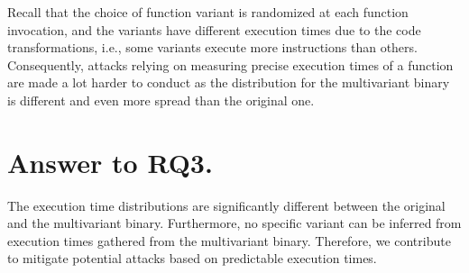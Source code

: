 Recall that the choice of function variant is randomized at each function invocation, and the variants have different execution times due to the code transformations, i.e., some variants execute more instructions than others. 
Consequently, attacks relying on measuring precise execution times \cite{blackhatpaper} of a function are made a lot harder to conduct as the distribution for the multivariant binary is different and even more spread than the original one.

\section{Answer to RQ3.}


The execution time distributions are significantly different between the original and the multivariant binary. Furthermore, no specific variant can be inferred from execution times gathered from the multivariant binary. Therefore, we contribute to mitigate potential attacks based on predictable execution times.
